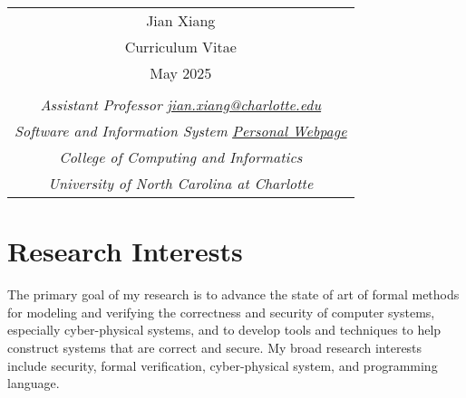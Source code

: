 \documentclass[11pt]{article}
\begin{document}
\renewcommand{\baselinestretch}{1.2} 

\pagestyle{empty} 


\begin{tabularx}{\linewidth}{@{} C @{}}
\Huge{\textsf{Jian Xiang}} \\[7.5pt]
Curriculum Vitae  \\
May 2025\\
\\
\noindent \textit{Assistant Professor} \hfill \href{mailto:jian.xiang@charlotte.edu}{\textit{jian.xiang@charlotte.edu}} \\
\noindent \textit{Software and Information System} \hfill { \href{https://www.jianxiang.info}{\textit{Personal Webpage}} } \\
\noindent \textit{College of Computing and Informatics} \hfill  { } \\
\noindent \textit{University of North Carolina at Charlotte}     \hfill  { } \\
\end{tabularx}




\section{Research Interests}

The primary goal of my research is to advance the state of art of formal methods for modeling and verifying the correctness and security of computer systems, especially cyber-physical systems, and to develop tools and techniques to help construct systems that are correct and secure.
%
My broad research interests include security, formal verification, cyber-physical system, and programming language.
\end{document}
